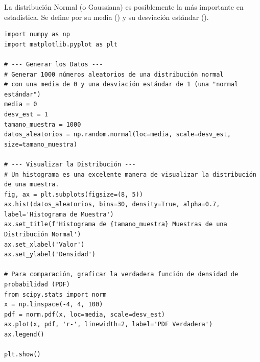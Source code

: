 \begin{example}
La distribución Normal (o Gaussiana) es posiblemente la más importante en estadística. Se define por su media () y su desviación estándar ().
\text{ }\begin{verbatim}
import numpy as np
import matplotlib.pyplot as plt

# --- Generar los Datos ---
# Generar 1000 números aleatorios de una distribución normal
# con una media de 0 y una desviación estándar de 1 (una "normal estándar")
media = 0
desv_est = 1
tamano_muestra = 1000
datos_aleatorios = np.random.normal(loc=media, scale=desv_est, size=tamano_muestra)

# --- Visualizar la Distribución ---
# Un histograma es una excelente manera de visualizar la distribución de una muestra.
fig, ax = plt.subplots(figsize=(8, 5))
ax.hist(datos_aleatorios, bins=30, density=True, alpha=0.7, label='Histograma de Muestra')
ax.set_title(f'Histograma de {tamano_muestra} Muestras de una Distribución Normal')
ax.set_xlabel('Valor')
ax.set_ylabel('Densidad')

# Para comparación, graficar la verdadera función de densidad de probabilidad (PDF)
from scipy.stats import norm
x = np.linspace(-4, 4, 100)
pdf = norm.pdf(x, loc=media, scale=desv_est)
ax.plot(x, pdf, 'r-', linewidth=2, label='PDF Verdadera')
ax.legend()

plt.show()
\end{verbatim}
\end{example}